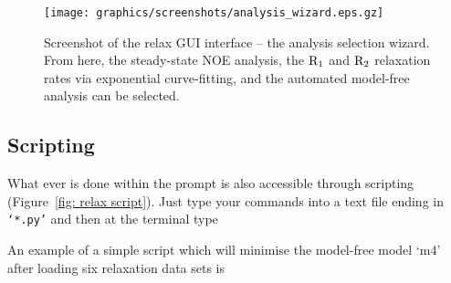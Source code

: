 \begin{figure}
\centerline{\texttt{[image: graphics/screenshots/analysis\_wizard.eps.gz]}}
\caption[GUI screenshot -- Analysis wizard screenshot]{Screenshot of the relax GUI interface -- the analysis selection wizard.  From here, the steady-state NOE analysis, the $\mathrm{R}_1$ and $\mathrm{R}_2$ relaxation rates via exponential curve-fitting, and the automated model-free analysis can be selected.}\label{fig: screenshot: analysis wizard}
\end{figure}




\subsection{Scripting}

What ever is done within the prompt is also accessible through scripting (Figure~\ref{fig: relax script}).  Just type your commands into a text file ending in \texttt{`*.py'} and then at the terminal type


An example of a simple script which will minimise the model-free model `m4' after loading six relaxation data sets is

